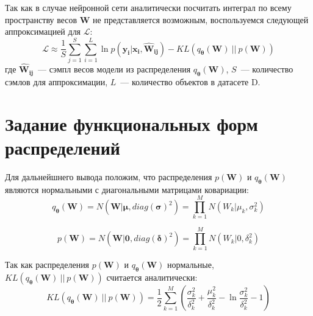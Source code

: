 \documentclass{article}
\numberwithin{equation}{section}
\begin{document}
    Так как в случае нейронной сети аналитически посчитать интеграл
    по всему пространству весов $\pmb{W}$ не представляется возможным,
    воспользуемся следующей аппроксимацией для $\mathcal{L}$:
    \begin{equation}\label{elbo_init}
        \mathcal{L}
        \approx
            \frac{1}{S} \sum_{j=1}^S \sum_{i=1}^{L} {
                \ln{
                    p(\pmb{y_{i}} | \pmb{x_{i}}, \pmb{\hat{W}_{ij}})
                }
            }
            -
            KL(q_{\pmb{\theta}}(\pmb{W})~||~p(\pmb{W}))
    \end{equation}
    где $\pmb{\hat{W}_{ij}}$~--- сэмпл весов модели из распределения
    $q_{\pmb{\theta}}(\pmb{W})$,
    $S$~--- количество сэмлов для аппроксимации,
    $L$~--- количество объектов в датасете D.

    \section{Задание функциональных форм распределений}
    Для дальнейшнего вывода положим,
    что распределения $p(\pmb{W})$ и $q_{\pmb{\theta}}(\pmb{W})$
    являются нормальными с диагональными матрицами ковариации:
    \begin{equation}
        q_{\pmb{\theta}}(\pmb{W})
        =
            N(
                \pmb{W} | \pmb{\mu}, diag(\pmb{\sigma})^{2}
            )
        =
            \prod_{k=1}^M
            N(
                W_k | \mu_k, \sigma_k^2
            )
    \end{equation}

    \begin{equation}
        p(\pmb{W})
        =
            N(
                \pmb{W} | \pmb{0}, diag(\pmb{\delta})^{2}
            )
        =
            \prod_{k=1}^M
            N(
                W_k | 0, \delta_k^2
            )
    \end{equation}

    Так как распределения $p(\pmb{W})$ и $q_{\pmb{\theta}}(\pmb{W})$ нормальные,
    $KL(q_{\pmb{\theta}}(\pmb{W})~||~p(\pmb{W}))$ считается аналитически:
    \begin{equation}\label{kl_init}
        KL(
            q_{\pmb{\theta}}(\pmb{W})~||~p(\pmb{W})
        )
        =
            \frac{1}{2}\sum_{k=1}^{M}(
                \frac
                    {\sigma_{k}^2}
                    {\delta_{k}^2}
                +
                \frac
                    {\mu_{k}^2}
                    {\delta_{k}^2}
                -
                \ln{
                    \frac
                        {\sigma_{k}^2}
                        {\delta_{k}^2}
                }
                - 1
            )
    \end{equation}
\end{document}
